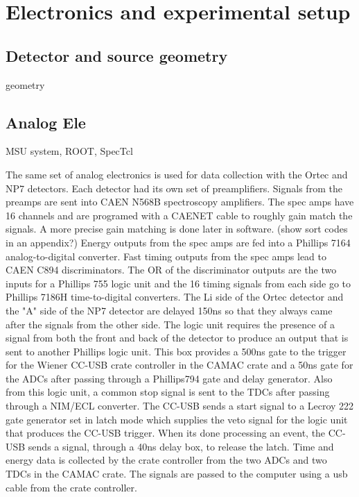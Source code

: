 \chapter{Electronics and experimental setup}
\label{ch:Electronics and experimental setup}
\section{Detector and source geometry}
\indent geometry

\section{Analog Ele}

MSU system, ROOT, SpecTcl

\indent The same set of analog electronics is used for data collection with the Ortec and NP7 detectors. Each detector had its own set of preamplifiers. Signals from the preamps are sent into CAEN N568B spectroscopy amplifiers. The spec amps have 16 channels and are programed with a CAENET cable to roughly gain match the signals. A more precise gain matching is done later in software. (show sort codes in an appendix?) Energy outputs from the spec amps are fed into a Phillips 7164 analog-to-digital converter. Fast timing outputs from the spec amps lead to CAEN C894 discriminators. The OR of the discriminator outputs are the two inputs for a Phillips 755 logic unit and the 16 timing signals from each side go to Phillips 7186H time-to-digital converters. The Li side of the Ortec detector and the "A" side of the NP7 detector are delayed 150ns so that they always came after the signals from the other side. The logic unit requires the presence of a signal from both the front and back of the detector to produce an output that is sent to another Phillips logic unit. This box provides a 500ns gate to the trigger for the Wiener CC-USB crate controller in the CAMAC crate and a 50ns gate for the ADCs after passing through a Phillips794 gate and delay generator. Also from this logic unit, a common stop signal is sent to the TDCs after passing through a NIM/ECL converter. The CC-USB sends a start signal to a Lecroy 222 gate generator set in latch mode which supplies the veto signal for the logic unit that produces the CC-USB trigger. When its done processing an event, the CC-USB sends a signal, through a 40ns delay box, to release the latch. Time and energy data is collected by the crate controller from the two ADCs and two TDCs in the CAMAC crate. The signals are passed to the computer using a usb cable from the crate controller. 

